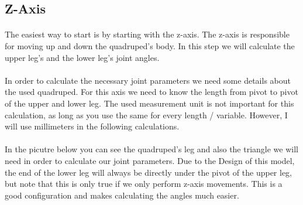 \documentclass{article}
\begin{document}
    
    \subsection{Z-Axis}
    \paragraph{}
    The easiest way to start is by starting with the z-axis. The z-axis is responsible for moving up and down the quadruped's body. In this step we will calculate the upper leg's and the lower leg's joint angles.

    \paragraph{}
    In order to calculate the necessary joint parameters we need some details about the used quadruped. For this axis we need to know the length from pivot to pivot of the upper and lower leg. The used measurement unit is not important for this calculation, as long as you use the same for every length / variable. However, I will use millimeters in the following calculations.

    \paragraph{}
    In the picutre below you can see the quadruped's leg and also the triangle we will need in order to calculate our joint parameters. Due to the Design of this model, the end of the lower leg will always be directly under the pivot of the upper leg, but note that this is only true if we only perform z-axis movements. This is a good configuration and makes calculating the angles much easier.
    
\end{document}

